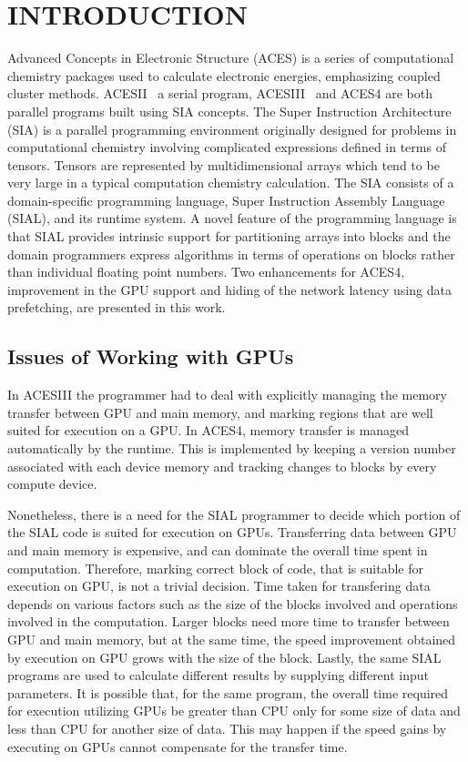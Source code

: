 \chapter{INTRODUCTION}\label{intro}
Advanced Concepts in Electronic Structure (ACES)
is a series of computational chemistry packages used to calculate electronic energies,
emphasizing coupled cluster methods. ACESII~\cite{doi:10.1002/qua.560440876} a serial program, ACESIII~\cite{doi:10.1002/wcms.77} and ACES4 are
both parallel programs built using SIA concepts. The Super Instruction Architecture (SIA)\cite{Sanders:2010:BLR:1884643.1884677} is a parallel programming environment
originally designed for problems in computational chemistry involving complicated
expressions defined in terms of tensors. Tensors are represented by
multidimensional arrays which tend to be very large in a typical computation chemistry
calculation. The SIA consists of a
domain-specific programming language, Super Instruction Assembly Language
(SIAL), and its runtime system.
A novel feature of the programming language is that SIAL provides intrinsic support
for partitioning arrays into blocks and the domain programmers express
algorithms in terms of operations on blocks rather than individual floating point
numbers. Two enhancements for ACES4, improvement in the GPU support and hiding of the network
latency using data prefetching, are presented in this work.\\


\section{Issues of Working with GPUs}
In ACESIII\cite{Jindal2016} the programmer had to deal with explicitly managing
the memory transfer between GPU and main memory, and marking regions that are well suited for execution
on a GPU. In ACES4, memory transfer is managed automatically by the runtime.
This is implemented by keeping a version number associated with each device memory
and tracking changes to blocks by every compute device.

Nonetheless, there is a need for the SIAL programmer to decide which portion of the SIAL code
is suited for execution on GPUs. Transferring data between GPU and main memory is
expensive\cite{datatransferoptimization}, and can dominate the overall time spent in computation. Therefore, marking
correct block of code, that is suitable for execution on GPU, is not
a trivial decision. Time taken for transfering data depends on various factors such as
the size of the blocks involved and operations involved in the computation.
Larger blocks need more time to transfer between GPU and main memory, but at the
same time, the speed improvement obtained by execution on GPU grows
with the size of the block. Lastly, the same SIAL programs are used to
calculate different results by supplying different input parameters. It is possible that,
for the same program, the overall time required for execution utilizing GPUs be greater
than CPU only for some size of data and less than CPU for another size of data.
This may happen if the speed gains by executing on GPUs cannot compensate for the
transfer time.

